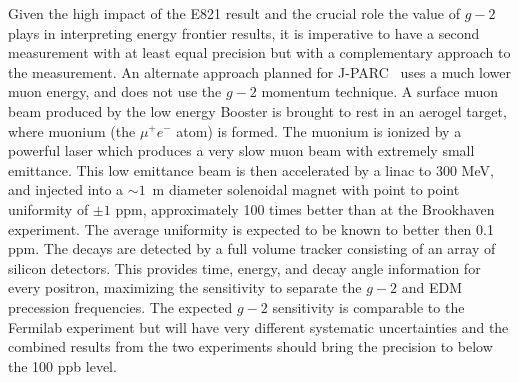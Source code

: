 Given the high impact of the E821 result and the 
crucial role the value of $g-2$ plays in interpreting energy frontier results, 
it is imperative to have a second measurement with at least equal 
precision but with a complementary approach to the measurement. 
An alternate approach planned for J-PARC~\cite{JPARC-Lg2} uses a much lower muon
energy, and does not use the  $g-2$ momentum technique. A surface muon beam
produced by  the low energy Booster is brought to rest in an aerogel
target, where muonium (the $\mu^+ e^-$ atom) is formed.  The muonium
is ionized by a powerful laser which produces a very slow muon beam with
extremely small emittance. This low emittance beam is then accelerated by a
linac to 300 MeV, and injected into a  $\sim 1$~m diameter
solenoidal magnet with point to point
uniformity of $\pm 1$ ppm, approximately 100 times better than at the Brookhaven experiment.  
The average uniformity is expected to be known to better then 0.1 ppm.  The decays are detected 
by a full volume tracker consisting of an array of silicon
detectors.  This provides time, energy, and decay angle information for every positron, maximizing
 the sensitivity to separate the  $g-2$ and EDM precession frequencies.  The expected   $g-2$ sensitivity 
 is comparable to the
 Fermilab experiment but will have very different systematic uncertainties and the combined results 
 from the two experiments should bring the precision to below the 100 ppb level.



